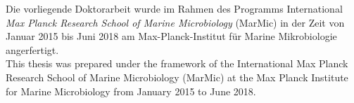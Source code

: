 \documentclass[10 pt, a4paper, twoside, openright]{Thesis}
\begin{document}
\begin{titlepage}
\begin{center}









\end{center}

\end{titlepage}

\newpage
\pagestyle{empty}


\begin{minipage}{0.3\textwidth}
\end{minipage} \hfill
\begin{minipage}{0.7\textwidth}
Die vorliegende Doktorarbeit wurde im Rahmen des Programms International \textit{Max Planck Research School of Marine Microbiology} (MarMic) in der Zeit von Januar 2015 bis Juni 2018 am Max-Planck-Institut f\"ur Marine Mikrobiologie angerfertigt. \\

This thesis was prepared  under the framework of the International Max Planck Research School of Marine Microbiology (MarMic) at the Max Planck Institute for Marine Microbiology from January 2015 to June 2018.\\
\end{minipage}
\end{document}
